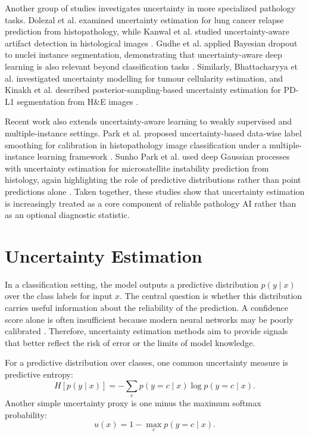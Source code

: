Another group of studies investigates uncertainty in more specialized pathology tasks. Dolezal et al. examined uncertainty estimation for lung cancer relapse prediction from histopathology, while Kanwal et al. studied uncertainty-aware artifact detection in histological images \cite{dolezal2022uncertainty,kanwal2024artifact}. Gudhe et al. applied Bayesian dropout to nuclei instance segmentation, demonstrating that uncertainty-aware deep learning is also relevant beyond classification tasks \cite{gudhe2023nuclei}. Similarly, Bhattacharyya et al. investigated uncertainty modelling for tumour cellularity estimation, and Kinakh et al. described posterior-sampling-based uncertainty estimation for PD-L1 segmentation from H\&E images \cite{bhattacharyya2025tumour,kinakh2025pdl1}.

Recent work also extends uncertainty-aware learning to weakly supervised and multiple-instance settings. Park et al. proposed uncertainty-based data-wise label smoothing for calibration in histopathology image classification under a multiple-instance learning framework \cite{park2025udls}. Sunho Park et al. used deep Gaussian processes with uncertainty estimation for microsatellite instability prediction from histology, again highlighting the role of predictive distributions rather than point predictions alone \cite{park2025dgp}. Taken together, these studies show that uncertainty estimation is increasingly treated as a core component of reliable pathology AI rather than as an optional diagnostic statistic.

\section{Uncertainty Estimation}

In a classification setting, the model outputs a predictive distribution $p(y \mid x)$ over the class labels for input $x$. The central question is whether this distribution carries useful information about the reliability of the prediction. A confidence score alone is often insufficient because modern neural networks may be poorly calibrated \cite{guo2017calibration}. Therefore, uncertainty estimation methods aim to provide signals that better reflect the risk of error or the limits of model knowledge.

For a predictive distribution over classes, one common uncertainty measure is predictive entropy:
\begin{equation}
    H[p(y \mid x)] = - \sum_c p(y=c \mid x) \log p(y=c \mid x).
\end{equation}
Another simple uncertainty proxy is one minus the maximum softmax probability:
\begin{equation}
    u(x) = 1 - \max_c p(y=c \mid x).
\end{equation}

